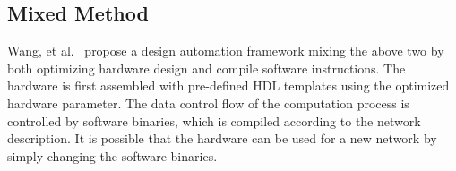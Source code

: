 \subsection{Mixed Method}
Wang, et al.~\cite{wang2016deepburning} propose a design automation framework mixing the above two by both optimizing hardware design and compile software instructions. The hardware is first assembled with pre-defined HDL templates using the optimized hardware parameter. The data control flow of the computation process is controlled by software binaries, which is compiled according to the network description. It is possible that the hardware can be used for a new network by simply changing the software binaries.

